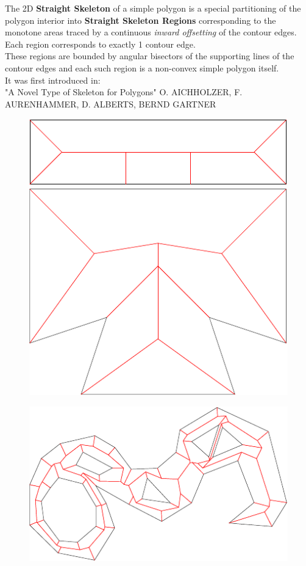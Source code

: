 The 2D \textbf{Straight Skeleton} of a simple polygon is a special partitioning of the polygon interior into \textbf{Straight Skeleton Regions} corresponding to the monotone areas traced by a continuous \textit{inward offsetting} of the contour edges. Each region corresponds to exactly 1 contour edge.\\
These regions are bounded by angular bisectors of the supporting lines of the contour edges and each such region is a non-convex simple polygon itself.\\
It was first introduced in:\\

"A Novel Type of Skeleton for Polygons"
  O. AICHHOLZER, F. AURENHAMMER, D. ALBERTS, BERND GARTNER

\begin{figure}[htbp]
\begin{ccTexOnly}
\begin{center}
\includegraphics{Straight_skeleton_2/fig2} %
\includegraphics{Straight_skeleton_2/fig3} %
\end{center}
\begin{center}
\includegraphics{Straight_skeleton_2/fig4} %

\end{center}
\end{ccTexOnly}
\end{figure}
